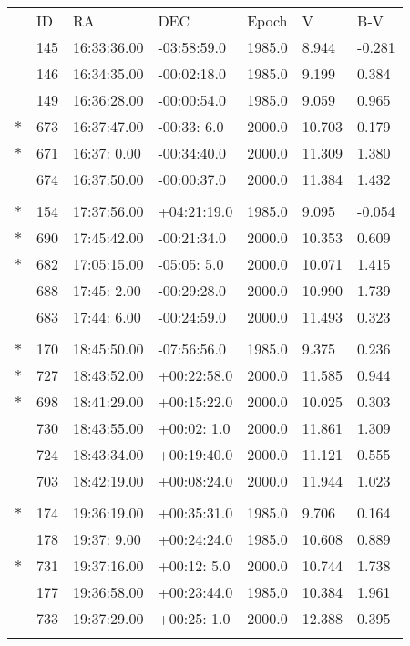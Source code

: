 \documentclass[10pt]{report}
\renewcommand{\[}{\begin{eqnarray}}
\renewcommand{\]}{\end{eqnarray}}
\begin{document}
\begin{tabular}{lllllll}
 &  ID&    RA    &      DEC  &  Epoch&     V  &     B-V    \\
 &145&16:33:36.00&-03:58:59.0&1985.0 &  8.944 & -0.281  \\
 &146&16:34:35.00&-00:02:18.0&1985.0 &  9.199 &  0.384  \\
 &149&16:36:28.00&-00:00:54.0&1985.0 &  9.059 &  0.965  \\
$\ast$&673&16:37:47.00&-00:33: 6.0&2000.0 & 10.703 &  0.179  \\
$\ast$&671&16:37: 0.00&-00:34:40.0&2000.0 & 11.309 &  1.380  \\
 &674&16:37:50.00&-00:00:37.0&2000.0 & 11.384 &  1.432  \\
\multicolumn{7}{l}{ }\\
$\ast$&154&17:37:56.00&+04:21:19.0&1985.0 &  9.095 & -0.054  \\
$\ast$&690&17:45:42.00&-00:21:34.0&2000.0 & 10.353 &  0.609  \\
$\ast$&682&17:05:15.00&-05:05: 5.0&2000.0 & 10.071 &  1.415  \\
 &688&17:45: 2.00&-00:29:28.0&2000.0 & 10.990 &  1.739  \\
 &683&17:44: 6.00&-00:24:59.0&2000.0 & 11.493 &  0.323  \\
\multicolumn{7}{l}{ }\\
$\ast$&170&18:45:50.00&-07:56:56.0&1985.0 &  9.375 &  0.236  \\
$\ast$&727&18:43:52.00&+00:22:58.0&2000.0 & 11.585 &  0.944  \\
$\ast$&698&18:41:29.00&+00:15:22.0&2000.0 & 10.025 &  0.303  \\
 &730&18:43:55.00&+00:02: 1.0&2000.0 & 11.861 &  1.309  \\
 &724&18:43:34.00&+00:19:40.0&2000.0 & 11.121 &  0.555 \\
 &703&18:42:19.00&+00:08:24.0&2000.0 & 11.944 &  1.023 \\
\multicolumn{7}{l}{ }\\
$\ast$&174&19:36:19.00&+00:35:31.0&1985.0 &  9.706 &  0.164 \\
 &178&19:37: 9.00&+00:24:24.0&1985.0 & 10.608 &  0.889 \\
$\ast$&731&19:37:16.00&+00:12: 5.0&2000.0 & 10.744 &  1.738 \\
 &177&19:36:58.00&+00:23:44.0&1985.0 & 10.384 &  1.961 \\
 &733&19:37:29.00&+00:25: 1.0&2000.0 & 12.388 &  0.395 \\
\multicolumn{7}{l}{ }\\

\end{tabular}
\end{document}
